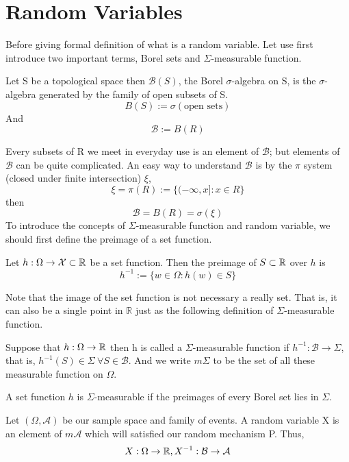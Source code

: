 \documentclass[../Probability_Theory.tex]{subfiles}
\begin{document}
\section{Random Variables}
Before giving formal definition of what is a random variable. Let use first introduce two important terms, Borel sets and $\Sigma$-measurable function.
\begin{definition}
Let S be a topological space then $\mathcal{B}(S)$, the Borel $\sigma$-algebra on S, is the $\sigma$-algebra generated by the family of open subsets of S. $$B(S):=\sigma(\text{open sets})$$
And $$\mathcal{B}:=B(R)$$
\end{definition}
Every subsets of R we meet in everyday use is an element of $\mathcal{B}$; but elements of $\mathcal{B}$ can be quite complicated. An easy way to understand $\mathcal{B}$ is by the $\pi$ system (closed under finite intersection) $\xi$, $$\xi=\pi(R):=\{(-\infty,x]:x\in R\}$$ then $$\mathcal{B}=B(R)=\sigma(\xi)$$
To introduce the concepts of $\Sigma$-measurable function and random variable, we should first define the preimage of a set function.
\begin{definition}
	Let $h:\Omega\rightarrow\mathcal{X}\subset{\mathbb R}$ be a set function. Then the preimage of $S\subset{\mathbb R}$ over $h$ is
	$$h^{-1}:=\{w\in\Omega:h(w)\in S \}$$
\end{definition}
Note that the image of the set function is not necessary a really set. That is, it can also be a single point in $\mathbb{R}$ just as the following definition of $\Sigma$-measurable function.
\begin{definition}
Suppose that $h:\Omega\rightarrow{\mathbb R}$ then h is called a $\Sigma$-measurable function if $h^{-1}:\mathcal{B}\rightarrow\Sigma$, that is, $h^{-1}(S)\in \Sigma\ \forall S\in\mathcal{B}.$
And we write $m\Sigma$ to be the set of all these measurable function on $\Omega$.
\end{definition} 
\begin{intuition}
	A set function $h$ is $\Sigma$-measurable if the preimages of every Borel set lies in $\Sigma$.
\end{intuition} 
\begin{definition}
Let $(\Omega,\mathcal{A})$ be our sample space and family of events. A random variable X  is an element of $m\mathcal{A}$ which will satisfied our random mechanism P. Thus,
$$X:\Omega\rightarrow{\mathbb R}, X^{-1}:\mathcal{B}\rightarrow\mathcal{A}$$
\end{definition}
\end{document}
